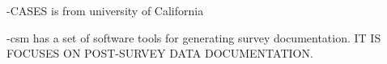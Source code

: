 -CASES is from university of California

-\gls{csm} has a set of software tools for generating survey documentation. IT IS FOCUSES ON POST-SURVEY DATA DOCUMENTATION.